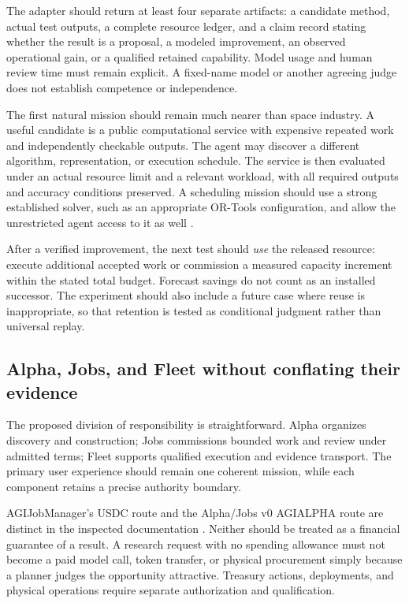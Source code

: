 \documentclass[11pt,letterpaper]{article}
\newcommand{\1}{\mathbf 1}
\theoremstyle{remark}\newtheorem{remark}{Remark}[section]
\begin{document}
The adapter should return at least four separate artifacts: a candidate method, actual test outputs, a complete resource ledger, and a claim record stating whether the result is a proposal, a modeled improvement, an observed operational gain, or a qualified retained capability. Model usage and human review time must remain explicit. A fixed-name model or another agreeing judge does not establish competence or independence.

The first natural mission should remain much nearer than space industry. A useful candidate is a public computational service with expensive repeated work and independently checkable outputs. The agent may discover a different algorithm, representation, or execution schedule. The service is then evaluated under an actual resource limit and a relevant workload, with all required outputs and accuracy conditions preserved. A scheduling mission should use a strong established solver, such as an appropriate OR-Tools configuration, and allow the unrestricted agent access to it as well \citep{ortools}.

After a verified improvement, the next test should \emph{use} the released resource: execute additional accepted work or commission a measured capacity increment within the stated total budget. Forecast savings do not count as an installed successor. The experiment should also include a future case where reuse is inappropriate, so that retention is tested as conditional judgment rather than universal replay.

\subsection{Alpha, Jobs, and Fleet without conflating their evidence}
The proposed division of responsibility is straightforward. Alpha organizes discovery and construction; Jobs commissions bounded work and review under admitted terms; Fleet supports qualified execution and evidence transport. The primary user experience should remain one coherent mission, while each component retains a precise authority boundary.

AGIJobManager's USDC route and the Alpha/Jobs v0 AGIALPHA route are distinct in the inspected documentation \citep{alphareadme,alphaguide}. Neither should be treated as a financial guarantee of a result. A research request with no spending allowance must not become a paid model call, token transfer, or physical procurement simply because a planner judges the opportunity attractive. Treasury actions, deployments, and physical operations require separate authorization and qualification.
\end{document}

